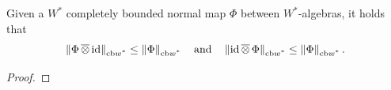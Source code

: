 \begin{proposition} \label{prop:cbnorm_id_otimes_phi}
   Given a $W^*$ completely bounded normal map $\Phi$ between $W^*$-algebras, it holds that
  \[
  \left\lVert \Phi \,\overline{\otimes} \, \mathrm{id} \right\rVert_{\text{cb$w^*$}} \leq \left\lVert \Phi \right\rVert_{\text{cb$w^*$}} \quad \text{and} \quad  \left\lVert \mathrm{id}\,\overline{\otimes} \, \Phi \right\rVert_{\text{cb$w^*$}} \leq \left\lVert \Phi \right\rVert_{\text{cb$w^*$}} .
\]
\end{proposition}

\begin{proof}

\end{proof}
